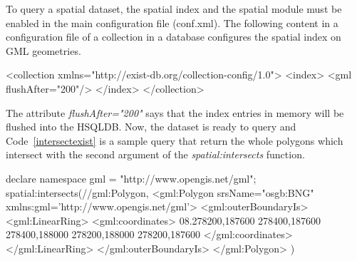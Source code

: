 \documentclass[a4paper,12pt]{article}
\begin{document}
To query a spatial dataset, the spatial index and the spatial module must be enabled in the main configuration file (conf.xml). The following content in a configuration file of a collection in a database configures the spatial index on GML geometries. 
\vspace{10px}
\begin{fakeJSON}
<collection xmlns="http://exist-db.org/collection-config/1.0">
  <index>
    <gml flushAfter="200"/>
  </index>
</collection>
\end{fakeJSON}
\vspace{10px}
The attribute \textit{flushAfter="200"} says that the index entries in memory will be flushed into the HSQLDB. 
Now, the dataset is ready to query and Code~\ref{intersectexist} is a sample query that return the whole polygons which intersect with the second argument of the \textit{spatial:intersects} function.
\begin{fakeXML}[label=intersectexist,caption=A spatial sample query in eXist-db using \textit{spatial:intersects} function]
declare namespace gml = "http://www.opengis.net/gml";
spatial:intersects(//gml:Polygon,
  <gml:Polygon srsName="osgb:BNG" xmlns:gml='http://www.opengis.net/gml'>
    <gml:outerBoundaryIs>
      <gml:LinearRing>
        <gml:coordinates>
	  08.278200,187600 278400,187600 278400,188000 278200,188000 278200,187600
	</gml:coordinates>
      </gml:LinearRing>
    </gml:outerBoundaryIs>
  </gml:Polygon>
) 
\end{fakeXML}
\end{document}
